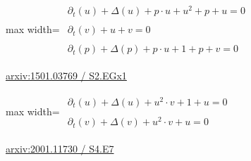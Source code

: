 \documentclass[UTF8,10pt,a4paper,fontset=mac]{ctexart}
\begin{document}
\begin{minipage}{\linewidth}\begin{center}\begin{adjustbox}{max width=\linewidth}$\displaystyle\begin{gathered}\begin{gathered}\partial_{t}(u)+\Delta(u)+p\cdot u+u^{2}+p+u=0\end{gathered}\\[5pt]\begin{gathered}\partial_{t}(v)+u+v=0\end{gathered}\\[5pt]\begin{gathered}\partial_{t}(p)+\Delta(p)+p\cdot u+1+p+v=0\end{gathered}\end{gathered}$\end{adjustbox}\end{center}{\small\href{https://arxiv.org/html/1501.03769#S2.EGx1}{arxiv:1501.03769 / S2.EGx1}}\par\end{minipage}\par\vspace{6mm}

\begin{minipage}{\linewidth}\begin{center}\begin{adjustbox}{max width=\linewidth}$\displaystyle\begin{gathered}\begin{gathered}\partial_{t}(u)+\Delta(u)+u^{2}\cdot v+1+u=0\end{gathered}\\[5pt]\begin{gathered}\partial_{t}(v)+\Delta(v)+u^{2}\cdot v+u=0\end{gathered}\end{gathered}$\end{adjustbox}\end{center}{\small\href{https://arxiv.org/html/2001.11730#S4.E7}{arxiv:2001.11730 / S4.E7}}\par\end{minipage}\par\vspace{6mm}
\end{document}
